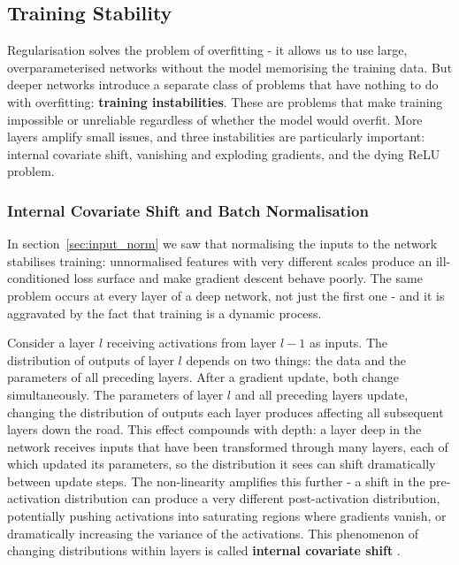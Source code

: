 \subsection{Training Stability}
\label{sec:training_stability}

Regularisation solves the problem of overfitting - it allows us to use large, overparameterised networks without the model memorising the training data. But deeper networks introduce a separate class of problems that have nothing to do with overfitting: \textbf{training instabilities}. These are problems that make training impossible or unreliable regardless of whether the model would overfit. More layers amplify small issues, and three instabilities are particularly important: internal covariate shift, vanishing and exploding gradients, and the dying ReLU problem.

\subsubsection{Internal Covariate Shift and Batch Normalisation}
\label{sec:batchnorm}

In section~\ref{sec:input_norm} we saw that normalising the inputs to the network stabilises training: unnormalised features with very different scales produce an ill-conditioned loss surface and make gradient descent behave poorly. The same problem occurs at every layer of a deep network, not just the first one - and it is aggravated by the fact that training is a dynamic process.

Consider a layer $l$ receiving activations from layer $l-1$ as inputs. The distribution of outputs of layer $l$ depends on two things: the data and the parameters of all preceding layers. After a gradient update, both change simultaneously. The parameters of layer $l$ and all preceding layers update, changing the distribution of outputs each layer produces affecting all subsequent layers down the road. This effect compounds with depth: a layer deep in the network receives inputs that have been transformed through many layers, each of which updated its parameters, so the distribution it sees can shift dramatically between update steps. The non-linearity amplifies this further - a shift in the pre-activation distribution can produce a very different post-activation distribution, potentially pushing activations into saturating regions where gradients vanish, or dramatically increasing the variance of the activations. This phenomenon of changing distributions within layers is called \textbf{internal covariate shift} \parencite{Ioffe2015}.

